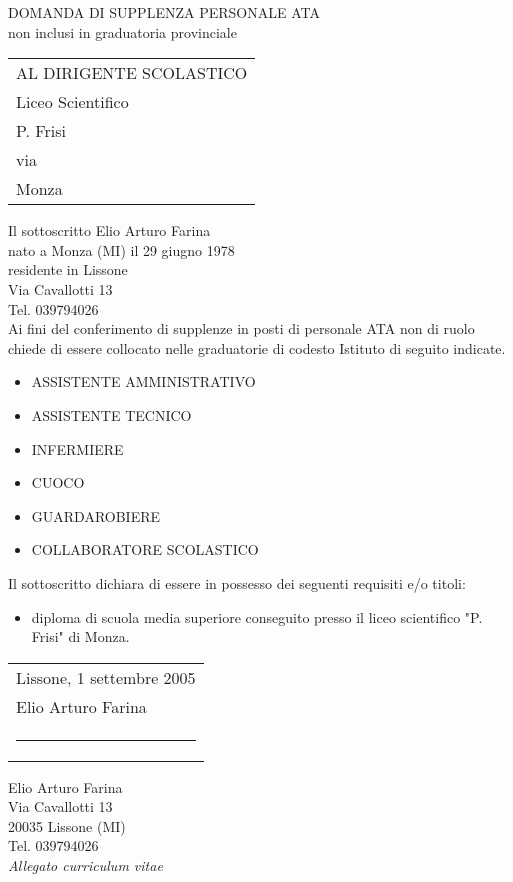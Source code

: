 \documentclass[12pt,a4paper]{article}
\newcommand{\tiposcuola}{Liceo Scientifico\\
P. Frisi}
\newcommand{\indirizzo}{via}
\newcommand{\citta}{Monza}
\begin{document}
\begin{center}
{\Large DOMANDA DI SUPPLENZA PERSONALE ATA}\\
\vspace{5pt}
{\large non inclusi in graduatoria provinciale}
\end{center}


\vspace{1cm}
\begin{flushright}
\begin{tabular}{l}
AL DIRIGENTE SCOLASTICO\\
\tiposcuola\\
\indirizzo\\
\citta\\
\end{tabular}
\end{flushright}


\vspace{1cm}
\noindent
Il sottoscritto Elio Arturo Farina\\
nato a Monza (MI) il 29 giugno 1978\\
residente in Lissone\\
Via Cavallotti 13\\
Tel. 039794026\\


\vspace{0.5cm}
Ai fini del conferimento di supplenze in posti di personale ATA non di ruolo chiede di essere collocato nelle graduatorie di codesto Istituto di seguito indicate.

\begin{itemize}
\item ASSISTENTE AMMINISTRATIVO
\item ASSISTENTE TECNICO
\item INFERMIERE
\item CUOCO
\item GUARDAROBIERE
\item COLLABORATORE SCOLASTICO
\end{itemize}

\vspace{1cm}
\noindent
Il sottoscritto dichiara di essere in possesso dei seguenti requisiti e/o titoli:
\begin{itemize}
\item diploma di scuola media superiore conseguito presso il liceo scientifico "P. Frisi" di Monza.
\end{itemize}

\vfill
\begin{flushright}
\begin{tabular}{l}
Lissone, 1 settembre 2005\\[5pt]
Elio Arturo Farina\\[25pt]
\rule{133pt}{0.5pt}
\end{tabular}
\end{flushright}


\vfill
\noindent
Elio Arturo Farina\\
Via Cavallotti 13\\
20035 Lissone (MI)\\
Tel. 039794026\\

\noindent
{\em Allegato curriculum vitae}\\
\end{document}
